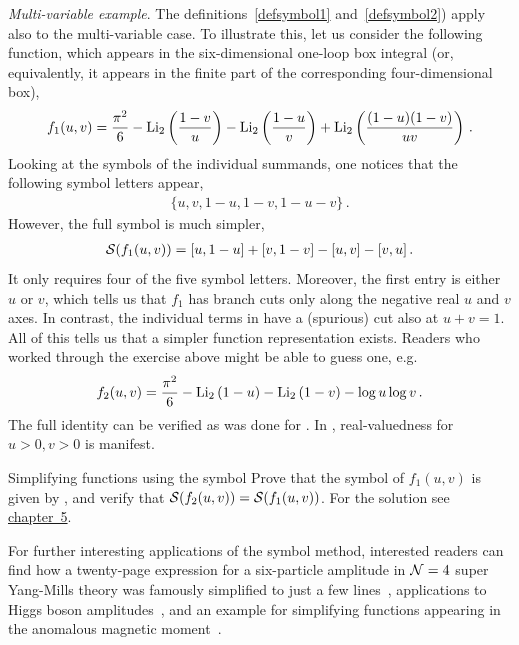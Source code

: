 \smallskip 


{\it Multi-variable example}.
The definitions~\eqref{defsymbol1} and~\eqref{defsymbol2}) apply also to the multi-variable case. To illustrate this, let us consider the following function, which appears in the six-dimensional one-loop box integral (or, equivalently, it appears in the finite part of the corresponding four-dimensional box),
\begin{align}\label{examplef1}
f_{1}(u,v) = \frac{\pi^2}{6} - {\rm Li}_{2} \left( \frac{1-v}{u}\right)  - {\rm Li}_{2} \left( \frac{1-u}{v}\right)+  {\rm Li}_{2} \left( \frac{(1-u)(1-v)}{u v}\right) \,.
\end{align}
Looking at the symbols of the individual summands, one notices that the following symbol letters appear,
\begin{align}\label{alphabet1massbox}
\{ u, v, 1-u, 1-v, 1-u-v \} \,.
\end{align}
However, the full symbol is much simpler,
\begin{align}\label{examplef1symbol}
{\cal S}(f_{1}(u,v)) = [u,1-u]+[v,1-v]-[u,v]-[v,u] \,.
\end{align} 
It only requires four of the five symbol letters. Moreover, the first entry is either $u$ or $v$, which tells us that $f_1$ has branch cuts only along the negative real $u$ and $v$ axes. In contrast, the individual terms in  have a (spurious) cut also at $u+v=1$.
All of this tells us that a simpler function representation exists.
Readers who worked through the exercise above might be able to guess one, e.g.
\begin{align}\label{examplef1b}
f_{2}(u,v) = \frac{\pi^2}{6} - {\rm Li}_{2} \left(1-u \right)  - {\rm Li}_{2} \left(1-v \right) - \log u \log v \,.
\end{align}
The full identity can be verified as was done for .
In , real-valuedness for $u>0,v>0$ is manifest.


\begin{exer}{Simplifying functions using the symbol}
\label{Ex:4.Symbolf2}
Prove that the symbol of $f_1(u,v)$ is given by , and verify that ${\cal S}(f_{2}(u,v))  = {\cal S}(f_{1}(u,v))$.
For the solution see \hyperref[Sol:4.Symbolf2]{chapter~5}.
\end{exer}




For further interesting applications of the symbol method, interested readers can find how a twenty-page expression for a six-particle amplitude in ${\cal N}=4$ super Yang-Mills theory was famously simplified to just a few lines~\cite{ch4Goncharov:2010jf}, applications to Higgs boson amplitudes~\cite{ch4Duhr:2012fh}, and an example for simplifying functions appearing in the anomalous magnetic moment~\cite{ch4Henn:2020omi}. 

